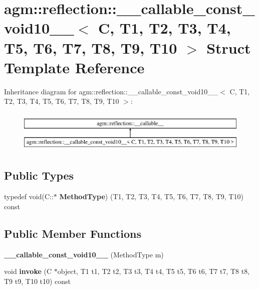 \hypertarget{structagm_1_1reflection_1_1____callable__const__void10____}{}\section{agm\+:\+:reflection\+:\+:\+\_\+\+\_\+callable\+\_\+const\+\_\+void10\+\_\+\+\_\+$<$ C, T1, T2, T3, T4, T5, T6, T7, T8, T9, T10 $>$ Struct Template Reference}
\label{structagm_1_1reflection_1_1____callable__const__void10____}
Inheritance diagram for agm\+:\+:reflection\+:\+:\+\_\+\+\_\+callable\+\_\+const\+\_\+void10\+\_\+\+\_\+$<$ C, T1, T2, T3, T4, T5, T6, T7, T8, T9, T10 $>$\+:\begin{figure}[H]
\begin{center}
\leavevmode
\includegraphics[height=2.000000cm]{structagm_1_1reflection_1_1____callable__const__void10____}
\end{center}
\end{figure}
\subsection*{Public Types}
\begin{DoxyCompactItemize}
\item 
typedef void(C\+::$\ast$ {\bfseries Method\+Type}) (T1, T2, T3, T4, T5, T6, T7, T8, T9, T10) const \hypertarget{structagm_1_1reflection_1_1____callable__const__void10_____a2d8e372ae9425a3dd85a360336f2677c}{}\label{structagm_1_1reflection_1_1____callable__const__void10_____a2d8e372ae9425a3dd85a360336f2677c}

\end{DoxyCompactItemize}
\subsection*{Public Member Functions}
\begin{DoxyCompactItemize}
\item 
{\bfseries \+\_\+\+\_\+callable\+\_\+const\+\_\+void10\+\_\+\+\_\+} (Method\+Type m)\hypertarget{structagm_1_1reflection_1_1____callable__const__void10_____ae53ef775c9ed8c42bbd4acc1d97bb4fe}{}\label{structagm_1_1reflection_1_1____callable__const__void10_____ae53ef775c9ed8c42bbd4acc1d97bb4fe}

\item 
void {\bfseries invoke} (C $\ast$object, T1 t1, T2 t2, T3 t3, T4 t4, T5 t5, T6 t6, T7 t7, T8 t8, T9 t9, T10 t10) const \hypertarget{structagm_1_1reflection_1_1____callable__const__void10_____accc22f4ea65facf023b99a834180ba75}{}\label{structagm_1_1reflection_1_1____callable__const__void10_____accc22f4ea65facf023b99a834180ba75}

\end{DoxyCompactItemize}

